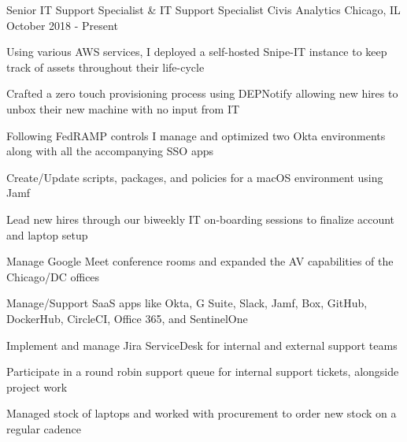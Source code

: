 

\begin{cventries}

	\cventry
	{Senior IT Support Specialist \& IT Support Specialist} %
	{Civis Analytics} %
	{Chicago, IL} %
	{October 2018 - Present} %
	{
		\begin{cvitems} %
			\item {Using various AWS services, I deployed a self-hosted Snipe-IT instance to keep track of assets throughout their life-cycle}
			\item {Crafted a zero touch provisioning process using DEPNotify allowing new hires to unbox their new machine with no input from IT}
			\item {Following FedRAMP controls I manage and optimized two Okta environments along with all the accompanying SSO apps}
			\item {Create/Update scripts, packages, and policies for a macOS environment using Jamf}
			\item {Lead new hires through our biweekly IT on-boarding sessions to finalize account and laptop setup}
			\item {Manage Google Meet conference rooms and expanded the AV capabilities of the Chicago/DC offices}
			\item {Manage/Support SaaS apps like Okta, G Suite, Slack, Jamf, Box, GitHub, DockerHub, CircleCI, Office 365, and SentinelOne}
			\item {Implement and manage Jira ServiceDesk for internal and external support teams}
			\item {Participate in a round robin support queue for internal support tickets, alongside project work}
			\item {Managed stock of laptops and worked with procurement to order new stock on a regular cadence}
		\end{cvitems}
	}


\end{cventries}
